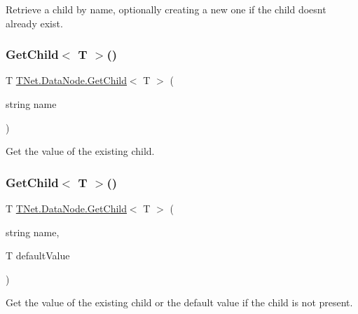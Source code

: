 Retrieve a child by name, optionally creating a new one if the child doesn\textquotesingle{}t already exist. 

\mbox{\label{class_t_net_1_1_data_node_ad48daa0909e1dbc05bd680735aec2d09}} 
\subsubsection{\texorpdfstring{Get\+Child$<$ T $>$()}{GetChild< T >()}\hspace{0.1cm}{\footnotesize\ttfamily [1/2]}}
{\footnotesize\ttfamily T \mbox{\hyperlink{class_t_net_1_1_data_node_aebf32646f6e54e2127ce51090549dd98}{T\+Net.\+Data\+Node.\+Get\+Child}}$<$ T $>$ (\begin{DoxyParamCaption}\item[{string}]{name }\end{DoxyParamCaption})}



Get the value of the existing child. 

\mbox{\label{class_t_net_1_1_data_node_a557421fb2b9b29bb88f2d5ae83a2f145}} 
\subsubsection{\texorpdfstring{Get\+Child$<$ T $>$()}{GetChild< T >()}\hspace{0.1cm}{\footnotesize\ttfamily [2/2]}}
{\footnotesize\ttfamily T \mbox{\hyperlink{class_t_net_1_1_data_node_aebf32646f6e54e2127ce51090549dd98}{T\+Net.\+Data\+Node.\+Get\+Child}}$<$ T $>$ (\begin{DoxyParamCaption}\item[{string}]{name,  }\item[{T}]{default\+Value }\end{DoxyParamCaption})}



Get the value of the existing child or the default value if the child is not present. 

\mbox{\label{class_t_net_1_1_data_node_afc1fb219f0560f952f36a13f004b50b1}} 
